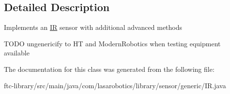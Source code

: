 \subsection{Detailed Description}
Implements an \hyperlink{classcom_1_1lasarobotics_1_1library_1_1sensor_1_1generic_1_1_i_r}{I\+R} sensor with additional advanced methods

T\+O\+D\+O ungenericify to H\+T and Modern\+Robotics when testing equipment available 

The documentation for this class was generated from the following file\+:\begin{DoxyCompactItemize}
\item 
ftc-\/library/src/main/java/com/lasarobotics/library/sensor/generic/I\+R.\+java\end{DoxyCompactItemize}
